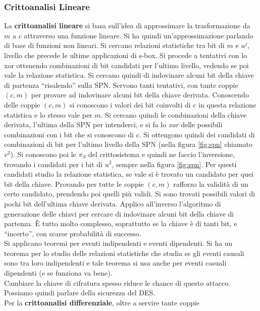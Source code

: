 \documentclass[a4paper,12pt, oneside]{book}
\begin{document}
\subsubsection{Crittoanalisi Lineare}
La \textbf{crittoanalisi lineare} si basa sull'idea di approssimare la
trasformazione da $m$ a $c$ attraverso una funzione lineare. Si ha quindi
un'approssimazione parlando di base di funzioni non lineari. Si cercano
relazioni 
statistiche tra bit di $m$ e $u^j$, livello che precede le ultime applicazioni
di s-box. Si procede a tentativi con lo xor ottenendo combinazioni di bit
candidati per l'ultimo livello, vedendo se poi vale la relazione statistica. Si
cercano quindi di indovinare alcuni bit della chiave di partenza ``risalendo''
sulla SPN. Servono tanti tentativi, con tante coppie $(c,m)$ per provare ad
indovinare alcuni bit della chiave derivata. Conoscendo delle coppie $(c,m)$ si
conoscono i valori dei bit coinvolti di $c$ in questa relazione statistica e lo
stesso vale per $m$. Si cercano quindi le combinazioni della chiave derivata,
l'ultima della SPN per intenderci, e si fa lo \textit{xor} delle possibili
combinazioni con i bit che si conoscono di $c$. Si ottengono quindi dei
candidati di combinazioni di bit per l'ultimo livello della SPN (nella figura
\ref{fig:spn} chiamato $v^2$). Si conoscono poi le $\pi_S$ del crittosistema e
quindi ne faccio l'inversione, trovando i candidati per i bit di $u^2$, sempre
nella figura \ref{fig:spn}. Per questi candidati studio la relazione statistica,
se vale si è trovato un candidato per quei bit della chiave. Provando per tutte
le coppie $(c,m)$ rafforzo la validità di un certo candidato, prendendo poi
quelli più validi. Si sono trovati possibili valori di pochi bit dell'ultima
chiave derivata. Applico all'inverso l'algoritmo di generazione delle chiavi per
cercare di indovinare alcuni bit della chiave di partenza. È tutto molto
complesso, soprattutto se la chiave è di tanti bit, e ``incerto'', con scarse
probabilità di successo.\\
Si applicano teoremi per eventi indipendenti e eventi dipendenti. Si ha un
teorema per lo studio delle relazioni statistiche che studia se gli eventi
causali sono tra loro indipendenti e tale teorema si usa anche per eventi
casuali dipendenti (e se funziona va bene).\\
Cambiare la chiave di cifratura spesso riduce le chance di questo attacco.\\
Possiamo quindi parlare della sicurezza del DES. \\
Per la \textbf{crittoanalisi differenziale}, oltre a servire tante coppie
\end{document}
